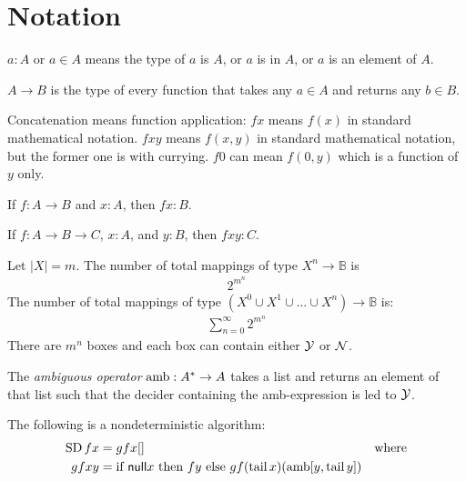 \chapter{Notation}

$a : A$ or $a \in A$ means the type of $a$ is $A$,
or $a$ is in $A$,
or $a$ is an element of $A$.

$A \to B$ is the type of every function
that takes any $a \in A$ and returns any $b \in B$.

Concatenation means function application:
$fx$ means $f(x)$ in standard mathematical notation.
$fxy$ means $f(x,y)$ in standard mathematical notation,
but the former one is with currying.
$f0$ can mean $f(0,y)$ which is a function of $y$ only.

If $f : A\to B$ and $x:A$, then $fx : B$.

If $f : A\to B\to C$, $x:A$, and $y:B$, then $fxy : C$.





\begin{mcor}
    Let $|X| = m$.
    The number of total mappings of type $X^n \to \mathbb B$ is
    \begin{align}
        2^{m^n}
    \end{align}
    The number of total mappings of type $(X^0 \cup X^1 \cup \ldots \cup X^n) \to \mathbb B$ is:
    \begin{align}
        \sum_{n=0}^{\infty} 2^{m^n}
    \end{align}
    There are $m^n$ boxes and each box can contain either $\mathcal Y$ or $\mathcal N$.
\end{mcor}





\begin{mdef}
    The \emph{ambiguous operator} $\operatorname{amb} : A^* \to A$
    takes a list and returns an element of that list
    such that the decider containing the amb-expression is led to $\mathcal Y$.
\end{mdef}

    The following is a nondeterministic algorithm:
    \begin{align}
        \operatorname{SD} fx &= gfx[] & \text{where}
        \\
        gfxy &= \text{if}~\textsf{null} x~\text{then}~fy~\text{else}~gf(\operatorname{tail} x)(\operatorname{amb}[y, \operatorname{tail} y])
    \end{align}






